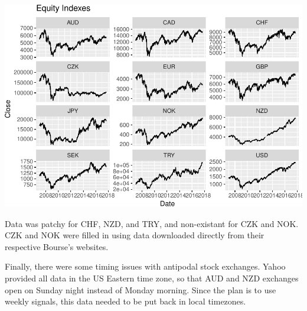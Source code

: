 \documentclass[]{article}
\newenvironment{Shaded}{\begin{snugshade}}{\end{snugshade}}
\newcommand{\KeywordTok}[1]{\textcolor[rgb]{0.13,0.29,0.53}{\textbf{#1}}}
\newcommand{\DataTypeTok}[1]{\textcolor[rgb]{0.13,0.29,0.53}{#1}}
\newcommand{\DecValTok}[1]{\textcolor[rgb]{0.00,0.00,0.81}{#1}}
\newcommand{\StringTok}[1]{\textcolor[rgb]{0.31,0.60,0.02}{#1}}
\newcommand{\ControlFlowTok}[1]{\textcolor[rgb]{0.13,0.29,0.53}{\textbf{#1}}}
\newcommand{\OperatorTok}[1]{\textcolor[rgb]{0.81,0.36,0.00}{\textbf{#1}}}
\newcommand{\NormalTok}[1]{#1}
\begin{document}
\begin{Shaded}
\end{Shaded}

\includegraphics{Econometric_FX_Forecasting_files/figure-latex/unnamed-chunk-1-1.pdf}

Data was patchy for CHF, NZD, and TRY, and non-existant for CZK and NOK.
CZK and NOK were filled in using data downloaded directly from their
respective Bourse's websites.

Finally, there were some timing issues with antipodal stock exchanges.
Yahoo provided all data in the US Eastern time zone, so that AUD and NZD
exchanges open on Sunday night instead of Monday morning. Since the plan
is to use weekly signals, this data needed to be put back in local
timezones.
\end{document}
